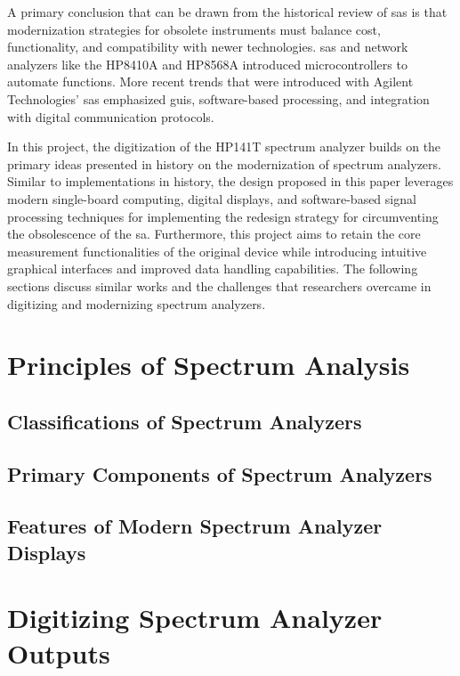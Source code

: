 \documentclass[class=report,11pt,crop=false]{standalone}
\begin{document}
A primary conclusion that can be drawn from the historical review of \acrshort{sa}s is that modernization strategies for obsolete instruments must balance cost, functionality, and compatibility with newer technologies. \acrshort{sa}s and network analyzers like the HP8410A and HP8568A introduced microcontrollers to automate functions. More recent trends that were introduced with Agilent Technologies' \acrshort{sa}s emphasized \acrshort{gui}s, software-based processing, and integration with digital communication protocols. 

In this project, the digitization of the HP141T spectrum analyzer builds on the primary ideas presented in history on the modernization of spectrum analyzers. Similar to implementations in history, the design proposed in this paper leverages modern single-board computing, digital displays, and software-based signal processing techniques for implementing the redesign strategy for circumventing the obsolescence of the \acrshort{sa}. Furthermore, this project aims to retain the core measurement functionalities of the original device while introducing intuitive graphical interfaces and improved data handling capabilities. The following sections discuss similar works and the challenges that researchers overcame in digitizing and modernizing spectrum analyzers.

\section{Principles of Spectrum Analysis}


\subsection{Classifications of Spectrum Analyzers}

\subsection{Primary Components of Spectrum Analyzers}

\subsection{Features of Modern Spectrum Analyzer Displays}

\section{Digitizing Spectrum Analyzer Outputs}
\end{document}
